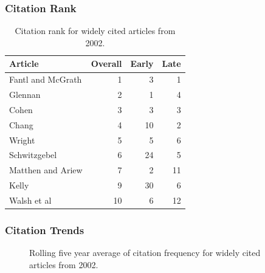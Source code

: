 \documentclass[
  10pt,
  letterpaper,
  DIV=11,
  numbers=noendperiod,
  twoside]{scrartcl}
\begin{document}
\subsubsection*{Citation Rank}\label{sec-rank-2002}

\begin{longtable}[]{@{}lrrr@{}}

\caption{\label{tbl-citation-rank-2002}Citation rank for widely cited
articles from 2002.}

\tabularnewline

\toprule\noalign{}
Article & Overall & Early & Late \\
\midrule\noalign{}
\endhead
\bottomrule\noalign{}
\endlastfoot
Fantl and McGrath & 1 & 3 & 1 \\
Glennan & 2 & 1 & 4 \\
Cohen & 3 & 3 & 3 \\
Chang & 4 & 10 & 2 \\
Wright & 5 & 5 & 6 \\
Schwitzgebel & 6 & 24 & 5 \\
Matthen and Ariew & 7 & 2 & 11 \\
Kelly & 9 & 30 & 6 \\
Walsh et al & 10 & 6 & 12 \\

\end{longtable}

\subsubsection*{Citation Trends}\label{sec-trends-2002}

\begin{figure}


\caption{\label{fig-citation-spaghetti-2002}Rolling five year average of
citation frequency for widely cited articles from 2002.}

\end{figure}%
\end{document}
